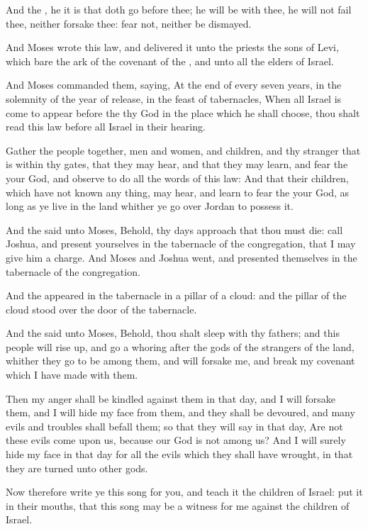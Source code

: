 \Verse And the \LORD, he it is that doth go before thee; he will be with thee, he will not fail thee, neither forsake thee: fear not, neither be dismayed.

\Verse And Moses wrote this law, and delivered it unto the priests the sons of Levi, which bare the ark of the covenant of the \LORD, and unto all the elders of Israel.

\Verse And Moses commanded them, saying, At the end of every seven years, in the solemnity of the year of release, in the feast of tabernacles, \Verse When all Israel is come to appear before the \LORD thy God in the place which he shall choose, thou shalt read this law before all Israel in their hearing.

\Verse Gather the people together, men and women, and children, and thy stranger that is within thy gates, that they may hear, and that they may learn, and fear the \LORD your God, and observe to do all the words of this law: \Verse And that their children, which have not known any thing, may hear, and learn to fear the \LORD your God, as long as ye live in the land whither ye go over Jordan to possess it.

\Verse And the \LORD said unto Moses, Behold, thy days approach that thou must die: call Joshua, and present yourselves in the tabernacle of the congregation, that I may give him a charge. And Moses and Joshua went, and presented themselves in the tabernacle of the congregation.

\Verse And the \LORD appeared in the tabernacle in a pillar of a cloud: and the pillar of the cloud stood over the door of the tabernacle.

\Verse And the \LORD said unto Moses, Behold, thou shalt sleep with thy fathers; and this people will rise up, and go a whoring after the gods of the strangers of the land, whither they go to be among them, and will forsake me, and break my covenant which I have made with them.

\Verse Then my anger shall be kindled against them in that day, and I will forsake them, and I will hide my face from them, and they shall be devoured, and many evils and troubles shall befall them; so that they will say in that day, Are not these evils come upon us, because our God is not among us?  \Verse And I will surely hide my face in that day for all the evils which they shall have wrought, in that they are turned unto other gods.

\Verse Now therefore write ye this song for you, and teach it the children of Israel: put it in their mouths, that this song may be a witness for me against the children of Israel.

